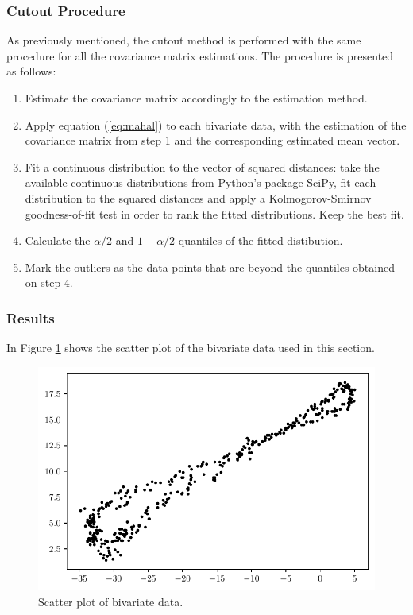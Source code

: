 \documentclass[11pt]{article}
\theoremstyle{definition}
\theoremstyle{remark}
\theoremstyle{remark}
\begin{document}
\subsubsection*{Cutout Procedure}
As previously mentioned, the cutout method is performed with the same
procedure for all the covariance matrix estimations. The procedure is
presented as follows:
\begin{enumerate}
\item Estimate the covariance matrix accordingly to the estimation
  method.
  \item Apply equation (\ref{eq:mahal}) to each bivariate data, with
    the estimation of the covariance matrix from step 1 and the
    corresponding estimated mean vector.
  \item Fit a continuous distribution to the vector of squared
    distances: take the available continuous distributions from
    Python's package SciPy, fit each distribution to the squared
    distances and apply a Kolmogorov-Smirnov goodness-of-fit test in
    order to rank the fitted distributions. Keep the best fit.
  \item Calculate the $\alpha/2$ and $1-\alpha/2$ quantiles of the fitted distibution.
  \item Mark the outliers as the data points that are beyond the
    quantiles obtained on step 4.
\end{enumerate}


\subsubsection*{Results}
In Figure \ref{fig:scatter} shows the scatter plot of the bivariate
data used in this section.

\begin{figure}[H]
  \centering \includegraphics[scale=.5]{../figs/scatter.pdf}
  \caption{Scatter plot of bivariate data.}
  \label{fig:scatter}
\end{figure}
\end{document}
